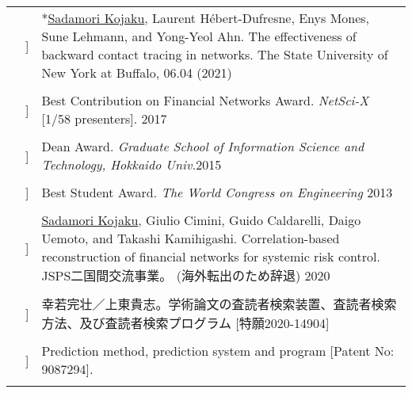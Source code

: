 \documentclass[letterpaper, 11pt]{article}
\newcounter{papercount}
\newcounter{papertype}
\newcommand{\changepapertype}{\setcounter{papercount}{0}\stepcounter{papertype}}
\newcommand{\paperitem}{%
\stepcounter{papercount}%
{\color{OliveGreen}{[\Alph{papertype}\thepapercount}]}
}
\begin{document}
\begin{longtable}{p{1.3in}p{2em}p{5.5in}}
                                                    &\paperitem & *\underline{Sadamori Kojaku}, Laurent H\'ebert-Dufresne, Enys Mones, Sune Lehmann, and Yong-Yeol Ahn.
                                                    The effectiveness of backward contact tracing in networks.
                                                    The State University of New York at Buffalo, 06.04 (2021)\\
                                                    & \\

    \changepapertype
    {\color{OliveGreen}{HONORS}}
                                                    &\paperitem & Best Contribution on Financial Networks Award. \textit{NetSci-X} [1/58 presenters]. \hfill 2017\\
                                                    & & \\
                                                    &\paperitem & Dean Award. \textit{Graduate School of Information Science and Technology, Hokkaido Univ.}\hfill 2015 \\
                                                    & & \\
                                                    &\paperitem & Best Student Award. \textit{The World Congress on Engineering} \hfill 2013\\
                                                    & & \\
    \changepapertype
    {\color{OliveGreen}{GRANT}}
                                                    &\paperitem & \underline{Sadamori Kojaku}, Giulio Cimini, Guido Caldarelli, Daigo Uemoto, and Takashi Kamihigashi. Correlation-based reconstruction of financial networks for systemic risk control. JSPS二国間交流事業。 (海外転出のため辞退) \hfill 2020 \\
                                                    & & \\
    \changepapertype
    {\color{OliveGreen}{PATENT}}
                                                    & \paperitem & 幸若完壮／上東貴志。学術論文の査読者検索装置、査読者検索方法、及び査読者検索プログラム [特願2020-14904]\\
                                                    & &\\
                                                    & \paperitem & Prediction method, prediction system and program [Patent No: 9087294].\\
                                                    & & \\


\end{longtable}
\end{document}
